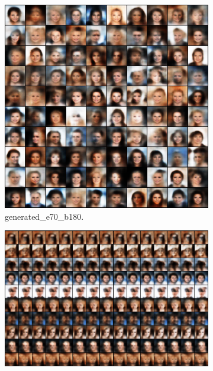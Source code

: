 \begin{figure}[!htbp]
   \centering
\begin{subfigure}[t]{0.98\textwidth}
   \includegraphics[width=\textwidth,max height=0.17\textheight,center]{2019-04-30/celeba/fixed-cost/info/generated_e70_b180.png}
   \caption{generated_e70_b180.}
   \label{fig:.._.._notes_journal_figures_2019-04-30_celeba_fixed-cost_info-a}
\end{subfigure}
\begin{subfigure}[t]{0.98\textwidth}
   \includegraphics[width=\textwidth,max height=0.17\textheight,center]{2019-04-30/celeba/fixed-cost/info/info_0_e70_b180.png}

\end{subfigure}
\end{figure}
